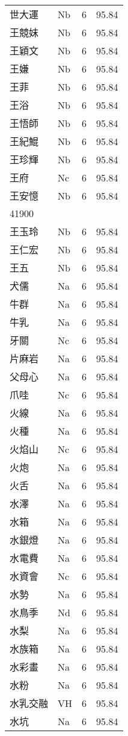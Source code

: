 \documentclass[twocolumn]{book}
\begin{document}
\begin{supertabular}{llrr}
世大運 & Nb & 6 &  95.84\\
王競妺 & Nb & 6 &  95.84\\
王穎文 & Nb & 6 &  95.84\\
王嫌 & Nb & 6 &  95.84\\
王菲 & Nb & 6 &  95.84\\
王浴 & Nb & 6 &  95.84\\
王悟師 & Nb & 6 &  95.84\\
王紀鯤 & Nb & 6 &  95.84\\
王珍輝 & Nb & 6 &  95.84\\
王府 & Nc & 6 &  95.84\\
王安憶 & Nb & 6 &  95.84\\
41900\\
王玉玲 & Nb & 6 &  95.84\\
王仁宏 & Nb & 6 &  95.84\\
王五 & Nb & 6 &  95.84\\
犬儒 & Na & 6 &  95.84\\
牛群 & Na & 6 &  95.84\\
牛乳 & Na & 6 &  95.84\\
牙關 & Nc & 6 &  95.84\\
片麻岩 & Na & 6 &  95.84\\
父母心 & Na & 6 &  95.84\\
爪哇 & Nc & 6 &  95.84\\
火線 & Na & 6 &  95.84\\
火種 & Na & 6 &  95.84\\
火焰山 & Nc & 6 &  95.84\\
火炮 & Na & 6 &  95.84\\
火舌 & Na & 6 &  95.84\\
水澤 & Na & 6 &  95.84\\
水箱 & Na & 6 &  95.84\\
水銀燈 & Na & 6 &  95.84\\
水電費 & Na & 6 &  95.84\\
水資會 & Nc & 6 &  95.84\\
水勢 & Na & 6 &  95.84\\
水鳥季 & Nd & 6 &  95.84\\
水梨 & Na & 6 &  95.84\\
水族箱 & Na & 6 &  95.84\\
水彩畫 & Na & 6 &  95.84\\
水粉 & Na & 6 &  95.84\\
水乳交融 & VH & 6 &  95.84\\
水坑 & Na & 6 &  95.84\\

\end{supertabular}
\end{document}
